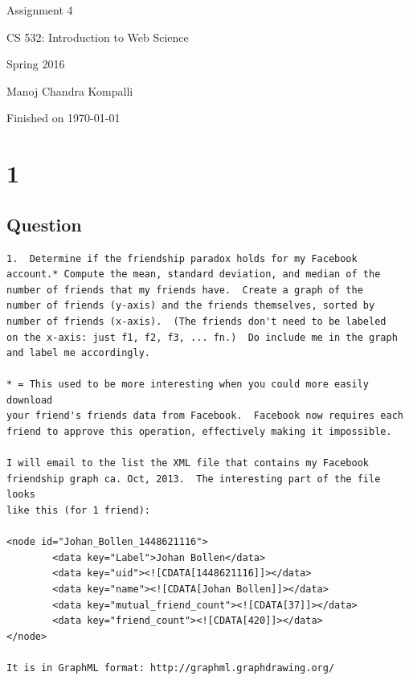 \documentclass[letterpaper,11pt]{article}
\begin{document}
\begin{titlepage}

\begin{center}

\Huge{Assignment 4}

\Large{CS 532:  Introduction to Web Science}

\Large{Spring 2016}

\Large{Manoj Chandra Kompalli}

\Large Finished on \today

\end{center}

\end{titlepage}

\newpage
\section*{1}

\subsection*{Question}

\begin{verbatim}
1.  Determine if the friendship paradox holds for my Facebook
account.* Compute the mean, standard deviation, and median of the
number of friends that my friends have.  Create a graph of the
number of friends (y-axis) and the friends themselves, sorted by
number of friends (x-axis).  (The friends don't need to be labeled
on the x-axis: just f1, f2, f3, ... fn.)  Do include me in the graph
and label me accordingly.

* = This used to be more interesting when you could more easily download
your friend's friends data from Facebook.  Facebook now requires each
friend to approve this operation, effectively making it impossible.

I will email to the list the XML file that contains my Facebook
friendship graph ca. Oct, 2013.  The interesting part of the file looks
like this (for 1 friend):

<node id="Johan_Bollen_1448621116">
        <data key="Label">Johan Bollen</data>
        <data key="uid"><![CDATA[1448621116]]></data>
        <data key="name"><![CDATA[Johan Bollen]]></data>
        <data key="mutual_friend_count"><![CDATA[37]]></data>
        <data key="friend_count"><![CDATA[420]]></data>
</node>

It is in GraphML format: http://graphml.graphdrawing.org/
\end{verbatim}
\end{document}
